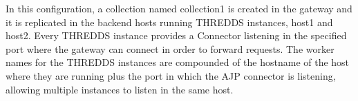 \documentclass[a4paper,12pt]{article}
\begin{document}
In this configuration, a collection named collection1 is created in the gateway and it is replicated in the backend hosts running THREDDS instances, host1 and host2. Every THREDDS instance provides a Connector listening in the specified port where the gateway can connect in order to forward requests. The worker names for the THREDDS instances are compounded of the hostname of the host where they are running plus the port in which the AJP connector is listening, allowing multiple instances to listen in the same host.
\end{document}
